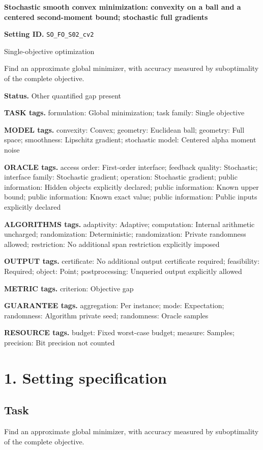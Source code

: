 \documentclass[10pt,a4paper]{article}
\begin{document}
\raggedright

{\LARGE\bfseries\sffamily\color{AtlasNavy} Stochastic smooth convex minimization: convexity on a ball and a centered second-moment bound; stochastic full gradients\par}\vspace{5pt}
\textbf{Setting ID.} \texttt{SO\_\allowbreak{}FO\_\allowbreak{}S02\_\allowbreak{}cv2}

Single-objective optimization

Find an approximate global minimizer, with accuracy measured by suboptimality of the complete objective.

\textbf{Status.} Other quantified gap present

\textbf{TASK tags.} formulation: Global minimization; task family: Single objective

\textbf{MODEL tags.} convexity: Convex; geometry: Euclidean ball; geometry: Full space; smoothness: Lipschitz gradient; stochastic model: Centered alpha moment noise

\textbf{ORACLE tags.} access order: First-order interface; feedback quality: Stochastic; interface family: Stochastic gradient; operation: Stochastic gradient; public information: Hidden objects explicitly declared; public information: Known upper bound; public information: Known exact value; public information: Public inputs explicitly declared

\textbf{ALGORITHMS tags.} adaptivity: Adaptive; computation: Internal arithmetic uncharged; randomization: Deterministic; randomization: Private randomness allowed; restriction: No additional span restriction explicitly imposed

\textbf{OUTPUT tags.} certificate: No additional output certificate required; feasibility: Required; object: Point; postprocessing: Unqueried output explicitly allowed

\textbf{METRIC tags.} criterion: Objective gap

\textbf{GUARANTEE tags.} aggregation: Per instance; mode: Expectation; randomness: Algorithm private seed; randomness: Oracle samples

\textbf{RESOURCE tags.} budget: Fixed worst-case budget; measure: Samples; precision: Bit precision not counted

\section{1. Setting specification}
\subsection{Task}
Find an approximate global minimizer, with accuracy measured by suboptimality of the complete objective.
\end{document}

